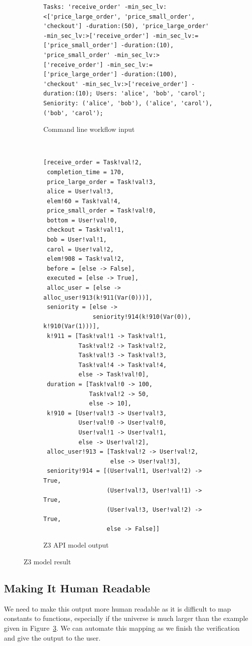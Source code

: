 \documentclass[a4paper]{report}
\begin{document}
\begin{figure}[H]
\centering
\begin{subfigure}[b]{\textwidth}
\begin{lstlisting}[frame=single]
Tasks: 'receive_order' -min_sec_lv:<['price_large_order', 'price_small_order', 'checkout'] -duration:(50), 'price_large_order' -min_sec_lv:>['receive_order'] -min_sec_lv:=['price_small_order'] -duration:(10), 'price_small_order' -min_sec_lv:>['receive_order'] -min_sec_lv:=['price_large_order'] -duration:(100), 'checkout' -min_sec_lv:>['receive_order'] -duration:(10); Users: 'alice', 'bob', 'carol'; Seniority: ('alice', 'bob'), ('alice', 'carol'), ('bob', 'carol');
\end{lstlisting}
\caption{Command line workflow input}
\label{fig:Command line worflow input}
\end{subfigure} \\
\begin{subfigure}[b]{\textwidth}
\begin{lstlisting}[frame=single]
[receive_order = Task!val!2,
 completion_time = 170,
 price_large_order = Task!val!3,
 alice = User!val!3,
 elem!60 = Task!val!4,
 price_small_order = Task!val!0,
 bottom = User!val!0,
 checkout = Task!val!1,
 bob = User!val!1,
 carol = User!val!2,
 elem!908 = Task!val!2,
 before = [else -> False],
 executed = [else -> True],
 alloc_user = [else -> alloc_user!913(k!911(Var(0)))],
 seniority = [else ->
              seniority!914(k!910(Var(0)), k!910(Var(1)))],
 k!911 = [Task!val!1 -> Task!val!1,
          Task!val!2 -> Task!val!2,
          Task!val!3 -> Task!val!3,
          Task!val!4 -> Task!val!4,
          else -> Task!val!0],
 duration = [Task!val!0 -> 100,
             Task!val!2 -> 50,
             else -> 10],
 k!910 = [User!val!3 -> User!val!3,
          User!val!0 -> User!val!0,
          User!val!1 -> User!val!1,
          else -> User!val!2],
 alloc_user!913 = [Task!val!2 -> User!val!2,
                   else -> User!val!3],
 seniority!914 = [(User!val!1, User!val!2) -> True,
                  (User!val!3, User!val!1) -> True,
                  (User!val!3, User!val!2) -> True,
                  else -> False]]
\end{lstlisting}
\caption{Z3 API model output}
\label{fig:Z3 API model output}
\end{subfigure}
\caption{Z3 model result}
\label{fig:Z3 model result}
\end{figure}

\newpage

\subsection{Making It Human Readable}
We need to make this output more human readable as it is difficult to map constants to functions, especially if the universe is much larger than the example given in Figure~\ref{fig:Z3 model result}. We can automate this mapping as we finish the verification and give the output to the user. \\
\end{document}
